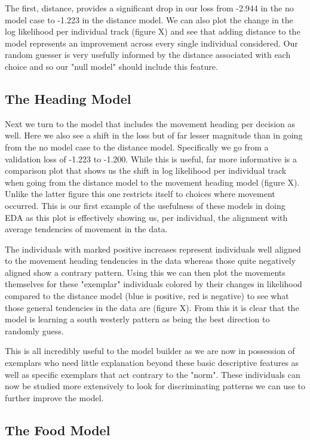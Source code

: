 \documentclass[11pt]{article}
\begin{document}
The first, distance, provides a significant drop in our loss from -2.944 in the no model case to -1.223 in the distance model. We can also plot the change in the log likelihood per individual track (figure X) and see that adding distance to the model represents an improvement across every single individual considered. Our random guesser is very usefully informed by the distance associated with each choice and so our "null model" should include this feature. 

\subsection*{The Heading Model}

Next we turn to the model that includes the movement heading per decision as well. Here we also see a shift in the loss but of far lesser magnitude than in going from the no model case to the distance model. Specifically we go from a validation loss of -1.223 to -1.200. While this is useful, far more informative is a comparison plot that shows us the shift in log likelihood per individual track when going from the distance model to the movement heading model (figure X). Unlike the latter figure this one restricts itself to choices where movement occurred. This is our first example of the usefulness of these models in doing EDA as this plot is effectively showing us, per individual, the alignment with average tendencies of movement in the data. 


The individuals with marked positive increases represent individuals well aligned to the movement heading tendencies in the data whereas those quite negatively aligned show a contrary pattern. Using this we can then plot the movements themselves for these "exemplar" individuals colored by their changes in likelihood compared to the distance model (blue is positive, red is negative) to see what those general tendencies in the data are (figure X). From this it is clear that the model is learning a south westerly pattern as being the best direction to randomly guess. 

This is all incredibly useful to the model builder as we are now in possession of exemplars who need little explanation beyond these basic descriptive features as well as specific exemplars that act contrary to the "norm". These individuals can now be studied more extensively to look for discriminating patterns we can use to further improve the model.  

\subsection*{The Food Model}
\end{document}
